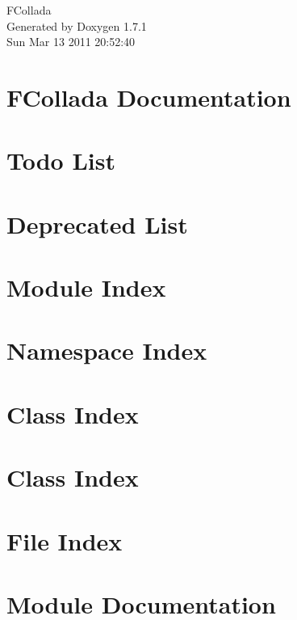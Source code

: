 \documentclass[a4paper]{book}
\begin{document}
\hypersetup{pageanchor=false}
\begin{titlepage}
\vspace*{7cm}
\begin{center}
{\Large FCollada }\\
\vspace*{1cm}
{\large Generated by Doxygen 1.7.1}\\
\vspace*{0.5cm}
{\small Sun Mar 13 2011 20:52:40}\\
\end{center}
\end{titlepage}
\clearemptydoublepage
{}
\tableofcontents
\clearemptydoublepage
{}
\hypersetup{pageanchor=true}
\chapter{FCollada Documentation}
\label{index}\hypertarget{index}{}
\chapter{Todo List}
\label{todo}
\hypertarget{todo}{}

\chapter{Deprecated List}
\label{deprecated}
\hypertarget{deprecated}{}

\chapter{Module Index}

\chapter{Namespace Index}

\chapter{Class Index}

\chapter{Class Index}

\chapter{File Index}

\chapter{Module Documentation}








\end{document}
